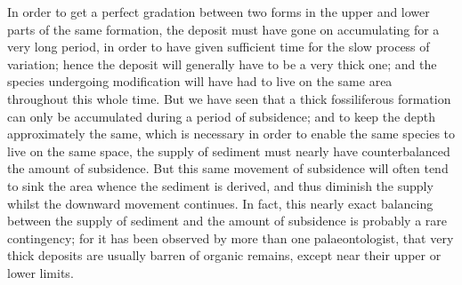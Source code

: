 \indent In order to get a perfect gradation between two forms in the upper and lower parts of the same formation, the deposit must have gone on accumulating for a very long period, in order to have given sufficient time for the slow process of variation; hence the deposit will generally have to be a very thick one; and the species undergoing modification will have had to live on the same area throughout this whole time. But we have seen that a thick fossiliferous formation can only be accumulated during a period of subsidence; and to keep the depth approximately the same, which is necessary in order to enable the same species to live on the same space, the supply of sediment must nearly have counterbalanced the amount of subsidence.  But this same movement of subsidence will often tend to sink the area whence the sediment is derived, and thus diminish the supply whilst the downward movement continues.  In fact, this nearly exact balancing between the supply of sediment and the amount of subsidence is probably a rare contingency; for it has been observed by more than one palaeontologist, that very thick deposits are usually barren of organic remains, except near their upper or lower limits.\\
